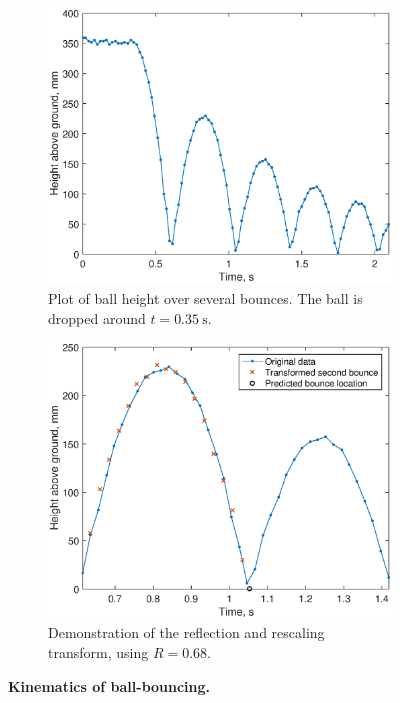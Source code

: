 \documentclass[letterpaper, 11pt]{article}
\begin{document}
\begin{enumerate}[label=\textbf{\arabic*.}]
\begin{figure}[ht]
    \centering
    \begin{subfigure}[t]{0.48\textwidth}
        \includegraphics[width=\textwidth]{images/fig_bounce.eps}
        \caption{Plot of ball height over several bounces. The ball is dropped around $t = \SI{0.35}{\second}$.}
        \label{fig:bounce}
    \end{subfigure}\hfill
    \begin{subfigure}[t]{0.48\textwidth}
        \includegraphics[width=\textwidth]{images/fig_transform.eps}
        \caption{Demonstration of the reflection and rescaling transform, using $R = 0.68$.}
        \label{fig:transform}
    \end{subfigure}
    \caption{\textbf{Kinematics of ball-bouncing.}}
\end{figure}


\end{enumerate}
\end{document}

